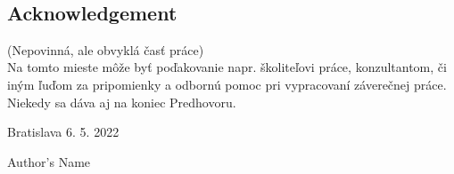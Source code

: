 
\
\vfill

\subsection*{Acknowledgement}

(Nepovinná, ale obvyklá časť práce)\\

Na tomto mieste môže byť poďakovanie napr. školiteľovi práce, konzultantom, či iným ľuďom za pripomienky a odbornú pomoc pri vypracovaní záverečnej práce. Niekedy sa dáva aj na koniec Predhovoru.

\vspace{10pt}

\noindent Bratislava 6. 5. 2022 \hfil
\newline
\begin{flushright}
	Author's Name $\qquad$
\end{flushright}
